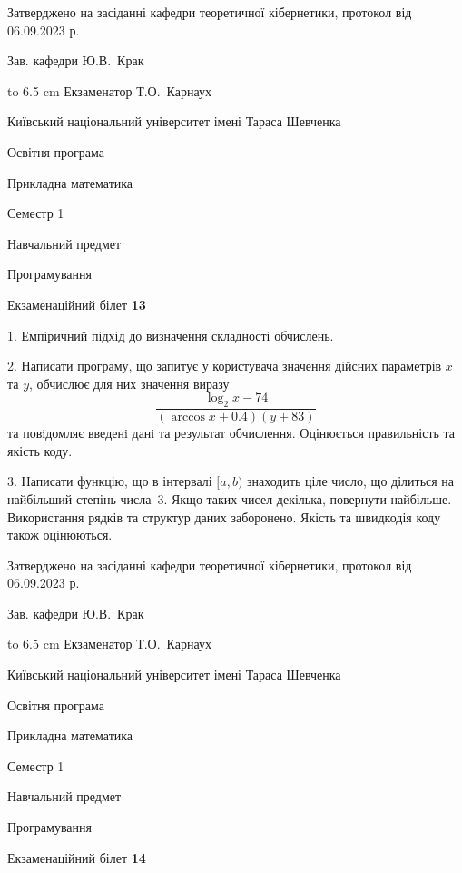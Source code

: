 \documentclass[12pt, ukrainian]{article}
\begin{document}
{\smallskip\smallskip \begin {scriptsize} Затверджено на засіданні кафедри теоретичної кібернетики, протокол   від   06.09.2023 р.\par\smallskip\smallskip\smallskip\smallskip
{\parbox {6.5 cm} {Зав. кафедри \dotfill Ю.В.~Крак}}\hspace {0.7cm} {\hbox to 6.5 cm { Екзаменатор \dotfill Т.О.~Карнаух}} \end{scriptsize}}
\newpage
{{\begin {scriptsize}\par
{ \center  Київський національний університет імені Тараса Шевченка \par}
{\parbox {5 cm}{Освітня програма \hfill}{\parbox {7 cm}{Прикладна математика\hfill}}\parbox {6 cm}{\hfill Семестр 1}}\par
{\parbox {5 cm} {Навчальний предмет \hfill}\parbox {7 cm}{Програмування \hfill}\parbox {6cm}{\hfill}\par}\vspace{-15pt} \end{scriptsize}}{\center Екзаменаційний білет \No \textbf { 13 }\par}}
{%
1. Емпіричний підхід до визначення складності обчислень.%
\par
2. Написати програму, що запитує у користувача значення дійсних параметрів $x$ та $y$, обчислює для них значення виразу 
$$\frac{\log_{2} x - 74}{(\arccos x + 0.4) (y + 83)}$$ 
та повiдомляє введенi данi та результат обчислення.
 Оцінюється правильність та якість коду.

\par
3. Написати функцію, що в інтервалі $[a, b)$ знаходить ціле число, що ділиться на найбільший степінь числа 3. Якщо таких чисел декілька, повернути найбільше.  Використання рядків та структур даних заборонено. Якість та швидкодія коду також оцінюються. 

}
{\smallskip\smallskip \begin {scriptsize} Затверджено на засіданні кафедри теоретичної кібернетики, протокол   від   06.09.2023 р.\par\smallskip\smallskip\smallskip\smallskip
{\parbox {6.5 cm} {Зав. кафедри \dotfill Ю.В.~Крак}}\hspace {0.7cm} {\hbox to 6.5 cm { Екзаменатор \dotfill Т.О.~Карнаух}} \end{scriptsize}}
\vspace{0.9cm}
{{\begin {scriptsize}\par
{ \center  Київський національний університет імені Тараса Шевченка \par}
{\parbox {5 cm}{Освітня програма \hfill}{\parbox {7 cm}{Прикладна математика\hfill}}\parbox {6 cm}{\hfill Семестр 1}}\par
{\parbox {5 cm} {Навчальний предмет \hfill}\parbox {7 cm}{Програмування \hfill}\parbox {6cm}{\hfill}\par}\vspace{-15pt} \end{scriptsize}}{\center Екзаменаційний білет \No \textbf { 14 }\par}}
\end{document}
